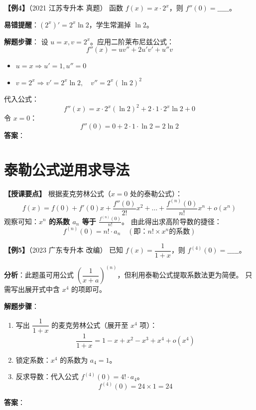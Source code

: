 \documentclass[12pt,a4paper]{article}
\begin{document}
\vspace{2em}

\textbf{【例4】}（2021 江苏专升本 真题）
函数 $f(x) = x \cdot 2^x$，则 $f''(0) = \_\_\_\_\_$。

\begin{tiptip}
\textbf{易错提醒}：$(2^x)' = 2^x \ln 2$，学生常漏掉 $\ln 2$。
\end{tiptip}

\textbf{解题步骤}：
设 $u=x, v=2^x$。应用二阶莱布尼兹公式：
\[
f''(x) = u v'' + 2 u' v' + u'' v
\]
\begin{itemize}
    \item $u=x \Rightarrow u'=1, u''=0$
    \item $v=2^x \Rightarrow v' = 2^x \ln 2, \quad v'' = 2^x (\ln 2)^2$
\end{itemize}
代入公式：
\[
f''(x) = x \cdot 2^x (\ln 2)^2 + 2 \cdot 1 \cdot 2^x \ln 2 + 0
\]
令 $x=0$：
\[
f''(0) = 0 + 2 \cdot 1 \cdot \ln 2 = 2\ln 2
\]
\textbf{答案}：

\newpage

\section{泰勒公式逆用求导法}

\textbf{【授课要点】}
根据麦克劳林公式（$x=0$ 处的泰勒公式）：
\[
f(x) = f(0) + f'(0)x + \frac{f''(0)}{2!}x^2 + \dots + \frac{f^{(n)}(0)}{n!}x^n + o(x^n)
\]
观察可知：\textbf{$x^n$ 的系数 $a_n$ 等于 $\frac{f^{(n)}(0)}{n!}$}。
由此得出求高阶导数的捷径：
\[
f^{(n)}(0) = n! \cdot a_n \quad (\text{即：} n! \times x^n \text{的系数})
\]

\vspace{1em}

\textbf{【例5】}（2023 广东专升本 改编）
已知 $f(x) = \dfrac{1}{1+x}$，则 $f^{(4)}(0) = \_\_\_\_\_$。

\begin{tiptip}
\textbf{分析}：此题虽可用公式 $\left(\dfrac{1}{x+a}\right)^{(n)}$，但利用泰勒公式提取系数法更为简便。
只需写出展开式中含 $x^4$ 的项即可。
\end{tiptip}

\textbf{解题步骤}：
\begin{enumerate}
    \item 写出 $\dfrac{1}{1+x}$ 的麦克劳林公式（展开至 $x^4$ 项）：
    \[
    \dfrac{1}{1+x} = 1 - x + x^2 - x^3 + x^4 + o(x^4)
    \]
    \item 锁定系数：$x^4$ 的系数为 $a_4 = 1$。
    \item 反求导数：代入公式 $f^{(4)}(0) = 4! \cdot a_4$。
    \[
    f^{(4)}(0) = 24 \times 1 = 24
    \]
\end{enumerate}
\textbf{答案}：
\end{document}
